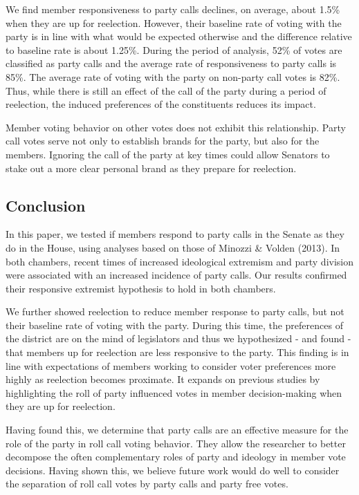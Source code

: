 \documentclass[12pt]{article}
\begin{document}
We find member responsiveness to party calls declines, on average, about 1.5\% when they are up for reelection. However, their baseline rate of voting with the party is in line with what would be expected otherwise and the difference relative to baseline rate is about 1.25\%. During the period of analysis, 52\% of votes are classified as party calls and the average rate of responsiveness to party calls is 85\%. The average rate of voting with the party on non-party call votes is 82\%. Thus, while there is still an effect of the call of the party during a period of reelection, the induced preferences of the constituents reduces its impact.

Member voting behavior on other votes does not exhibit this relationship. Party call votes serve not only to establish brands for the party, but also for the members. Ignoring the call of the party at key times could allow Senators to stake out a more clear personal brand as they prepare for reelection. 

\subsection*{Conclusion}

In this paper, we tested if members respond to party calls in the Senate as they do in the House, using analyses based on those of Minozzi \& Volden (2013). In both chambers, recent times of increased ideological extremism and party division were associated with an increased incidence of party calls. Our results confirmed their responsive extremist hypothesis to hold in both chambers. 

We further showed reelection to reduce member response to party calls, but not their baseline rate of voting with the party. During this time, the preferences of the district are on the mind of legislators and thus we hypothesized - and found - that members up for reelection are less responsive to the party. This finding is in line with expectations of members working to consider voter preferences more highly as reelection becomes proximate. It expands on previous studies by highlighting the roll of party influenced votes in member decision-making when they are up for reelection. 

Having found this, we determine that party calls are an effective measure for the role of the party in roll call voting behavior. They allow the researcher to better decompose the often complementary roles of party and ideology in member vote decisions. Having shown this, we believe future work would do well to consider the separation of roll call votes by party calls and party free votes. 
\end{document}
